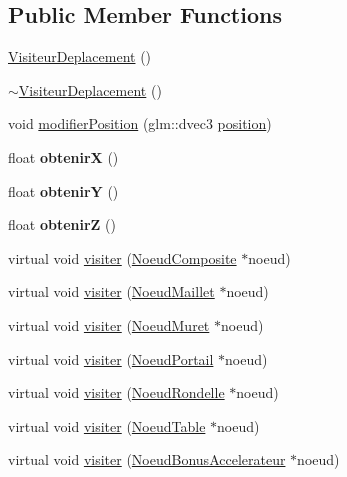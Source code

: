\subsection*{Public Member Functions}
\begin{DoxyCompactItemize}
\item 
\hyperlink{group__inf2990_ga96164e1d4e72549c09424358e8f01e78}{Visiteur\+Deplacement} ()
\item 
\hyperlink{group__inf2990_ga0f03274d6afe77a7a57f3b7f20417ec8}{$\sim$\+Visiteur\+Deplacement} ()
\item 
void \hyperlink{group__inf2990_ga882cdd41499aab95ccc1eecbafebbb09}{modifier\+Position} (glm\+::dvec3 \hyperlink{structposition}{position})
\item 
\hypertarget{class_visiteur_deplacement_a1be5d6505e3355287b55d5fbe448e600}{}\label{class_visiteur_deplacement_a1be5d6505e3355287b55d5fbe448e600} 
float {\bfseries obtenirX} ()
\item 
\hypertarget{class_visiteur_deplacement_a03f96f101ef64f04e83bc7475f0f7030}{}\label{class_visiteur_deplacement_a03f96f101ef64f04e83bc7475f0f7030} 
float {\bfseries obtenirY} ()
\item 
\hypertarget{class_visiteur_deplacement_a3c272de73ba4dafc10c9a1904f780eee}{}\label{class_visiteur_deplacement_a3c272de73ba4dafc10c9a1904f780eee} 
float {\bfseries obtenirZ} ()
\item 
virtual void \hyperlink{group__inf2990_ga2d81940a4fd36b6c5ea00ef022191dc8}{visiter} (\hyperlink{class_noeud_composite}{Noeud\+Composite} $\ast$noeud)
\item 
virtual void \hyperlink{group__inf2990_gac3e9945e0d76cd90f7f7722fccd74298}{visiter} (\hyperlink{class_noeud_maillet}{Noeud\+Maillet} $\ast$noeud)
\item 
virtual void \hyperlink{group__inf2990_ga2c4d7672f376bd635318a0e987e696ed}{visiter} (\hyperlink{class_noeud_muret}{Noeud\+Muret} $\ast$noeud)
\item 
virtual void \hyperlink{group__inf2990_ga27370e2a2e188d7d209e20e4e8228f42}{visiter} (\hyperlink{class_noeud_portail}{Noeud\+Portail} $\ast$noeud)
\item 
virtual void \hyperlink{group__inf2990_ga9b1dde6c8d6e7dab86ffa64925b62edd}{visiter} (\hyperlink{class_noeud_rondelle}{Noeud\+Rondelle} $\ast$noeud)
\item 
virtual void \hyperlink{group__inf2990_ga9599fc0f1de752c95febe9315eefc808}{visiter} (\hyperlink{class_noeud_table}{Noeud\+Table} $\ast$noeud)
\item 
virtual void \hyperlink{group__inf2990_gaa214ddf720db2c3969d3bde0e5e1ce3a}{visiter} (\hyperlink{class_noeud_bonus_accelerateur}{Noeud\+Bonus\+Accelerateur} $\ast$noeud)
\end{DoxyCompactItemize}
